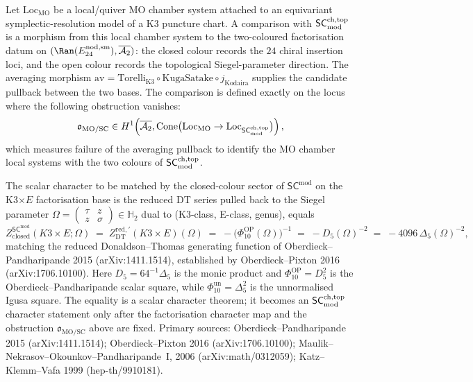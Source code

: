 \begin{remark}
\label{rem:msco-K3-hilb-compatibility}
Let $\mathrm{Loc}_{\mathrm{MO}}$ be a local/quiver MO chamber system
attached to an equivariant symplectic-resolution model of a K3
puncture chart. A comparison with $\mathsf{SC}^{\mathrm{ch,top}}_{\mathrm{mod}}$ is a morphism from this
local chamber system to the two-coloured factorisation datum on
$(\Ran(E^{\mathrm{nod,sm}}_{24}),\overline{\mathcal A_2})$: the
closed colour records the $24$ chiral insertion loci, and the open
colour records the topological Siegel-parameter direction. The
averaging morphism
$\mathrm{av}=\mathrm{Torelli}_{\mathrm K3}\circ
\mathrm{KugaSatake}\circ j_{\mathrm{Kodaira}}$ supplies the candidate
pullback between the two bases. The comparison is defined exactly on
the locus where the following obstruction vanishes:
\[
 \mathfrak{o}_{\mathrm{MO/SC}}
 \in
 H^1\!\left(
 \overline{\mathcal A_2},
 \operatorname{Cone}\bigl(
 \mathrm{Loc}_{\mathrm{MO}}\to
 \mathrm{Loc}_{\mathsf{SC}^{\mathrm{ch,top}}_{\mathrm{mod}}}
 \bigr)
 \right),
\]
which measures failure of the averaging pullback to identify the MO
chamber local systems with the two colours of $\mathsf{SC}^{\mathrm{ch,top}}_{\mathrm{mod}}$.
\end{remark}

\begin{remark}
\label{rem:msco-K3xE-DT-partition}
The scalar character to be matched by the closed-colour sector of
$\mathsf{SC}^{\mathrm{mod}}$ on the K3$\times E$ factorisation base is
the reduced DT series pulled back to the Siegel parameter
$\Omega = \left(\begin{smallmatrix} \tau & z \\ z & \sigma \end{smallmatrix}\right)
\in \mathbb{H}_2$ dual to (K3-class, E-class, genus), equals
\[
 Z^{\mathsf{SC}^{\mathrm{mod}}}_{\mathrm{closed}}(K3 \times E; \Omega)
 \;=\; Z^{\mathrm{red}, \prime}_{\mathrm{DT}}(K3 \times E)(\Omega)
 \;=\; -\bigl(\Phi_{10}^{\mathrm{OP}}(\Omega)\bigr)^{-1}
 \;=\; -D_5(\Omega)^{-2}
 \;=\; -4096\,\Delta_5(\Omega)^{-2},
\]
matching the reduced Donaldson--Thomas generating function of
Oberdieck--Pandharipande 2015 (arXiv:1411.1514), established by
Oberdieck--Pixton 2016 (arXiv:1706.10100). Here
$D_5=64^{-1}\Delta_5$ is the monic product and
$\Phi_{10}^{\mathrm{OP}}=D_5^2$ is the
Oberdieck--Pandharipande scalar square, while
$\Phi_{10}^{\mathrm{un}}=\Delta_5^2$ is the unnormalised Igusa square.
The equality is a scalar character theorem; it becomes an
$\mathsf{SC}^{\mathrm{ch,top}}_{\mathrm{mod}}$ character statement only after the factorisation character map
and the obstruction $\mathfrak{o}_{\mathrm{MO/SC}}$ above are fixed.
Primary sources:
Oberdieck--Pandharipande 2015 (arXiv:1411.1514);
Oberdieck--Pixton 2016 (arXiv:1706.10100);
Maulik--Nekrasov--Okounkov--Pandharipande~I, 2006 (arXiv:math/0312059);
Katz--Klemm--Vafa 1999 (hep-th/9910181).
\end{remark}

